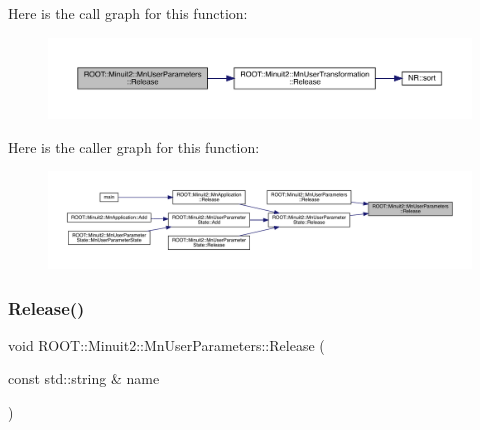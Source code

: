Here is the call graph for this function\+:\nopagebreak
\begin{figure}[H]
\begin{center}
\leavevmode
\includegraphics[width=350pt]{d6/d10/classROOT_1_1Minuit2_1_1MnUserParameters_a7bd8fe4d8f50de145f3f3abc6ec4fae4_cgraph}
\end{center}
\end{figure}
Here is the caller graph for this function\+:\nopagebreak
\begin{figure}[H]
\begin{center}
\leavevmode
\includegraphics[width=350pt]{d6/d10/classROOT_1_1Minuit2_1_1MnUserParameters_a7bd8fe4d8f50de145f3f3abc6ec4fae4_icgraph}
\end{center}
\end{figure}
\mbox{\label{classROOT_1_1Minuit2_1_1MnUserParameters_ac178a853a9641a88a9a1412224e6e105}} 
\subsubsection{\texorpdfstring{Release()}{Release()}\hspace{0.1cm}{\footnotesize\ttfamily [3/4]}}
{\footnotesize\ttfamily void R\+O\+O\+T\+::\+Minuit2\+::\+Mn\+User\+Parameters\+::\+Release (\begin{DoxyParamCaption}\item[{const std\+::string \&}]{name }\end{DoxyParamCaption})}

